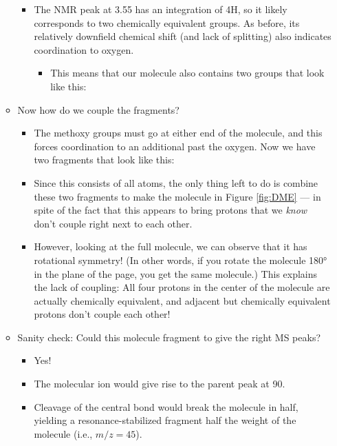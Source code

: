 \documentclass[../notes.tex]{subfiles}
\begin{document}
\begin{itemize}
\begin{itemize}
\begin{itemize}
\begin{itemize}
            \end{itemize}
            \item The  NMR peak at \SI{3.55}{\partspermillion} has an integration of 4H, so it likely corresponds to two chemically equivalent  groups. As before, its relatively downfield chemical shift (and lack of splitting) also indicates coordination to oxygen.
            \begin{itemize}
                \item This means that our molecule also contains two groups that look like this: {\tiny{}}
            \end{itemize}
        \end{itemize}
        \item Now how do we couple the fragments?
        \begin{itemize}
            \item The methoxy groups must go at either end of the molecule, and this forces coordination to an additional  past the oxygen. Now we have two fragments that look like this: {\tiny{}}
            \item Since this consists of all atoms, the only thing left to do is combine these two fragments to make the molecule in Figure \ref{fig:DME} --- in spite of the fact that this appears to bring protons that we \emph{know} don't couple right next to each other.
            \item However, looking at the full molecule, we can observe that it has rotational symmetry! (In other words, if you rotate the molecule \ang{180} in the plane of the page, you get the same molecule.) This explains the lack of coupling: All four protons in the center of the molecule are actually chemically equivalent, and adjacent but chemically equivalent protons don't couple each other!
        \end{itemize}
        \item Sanity check: Could this molecule fragment to give the right MS peaks?
        \begin{itemize}
            \item Yes!
            \item The molecular ion would give rise to the parent peak at 90.
            \item Cleavage of the central  bond would break the molecule in half, yielding a resonance-stabilized fragment half the weight of the molecule (i.e., $m/z=45$).

\end{itemize}
\end{itemize}
\end{itemize}
\end{document}

